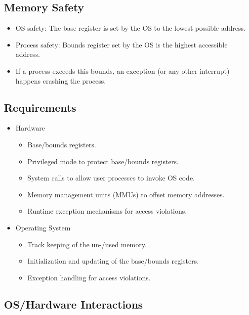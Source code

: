         \subsection{Memory Safety}
            \begin{itemize}
            	\item OS safety: The base register is set by the OS to the lowest possible address.
            	\item Process safety: Bounds register set by the OS is the highest accessible address.
            	\item If a process exceeds this bounds, an exception (or any other interrupt) happens crashing the process.
            \end{itemize}

        \subsection{Requirements}
            \begin{itemize}
            	\item Hardware
                	\begin{itemize}
                		\item Base/bounds registers.
                		\item Privileged mode to protect base/bounds registers.
                		\item System calls to allow user processes to invoke OS code.
                		\item Memory management units (MMUs) to offset memory addresses.
                		\item Runtime exception mechanisms for access violations.
                	\end{itemize}
            	\item Operating System
                	\begin{itemize}
                		\item Track keeping of the un-/used memory.
                		\item Initialization and updating of the base/bounds registers.
                		\item Exception handling for access violations.
                	\end{itemize}
            \end{itemize}

        \subsection{OS/Hardware Interactions}
